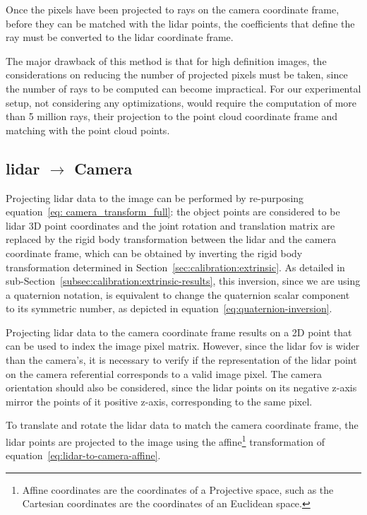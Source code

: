 Once the pixels have been projected to rays on the camera coordinate frame, before they can be matched with the \ac{lidar} points, the coefficients that define the ray must be converted to the \ac{lidar} coordinate frame.

The major drawback of this method is that for high definition images, the considerations on reducing the number of projected pixels must be taken, since the number of rays to be computed can become impractical. For our experimental setup, not considering any optimizations, would require the computation of more than 5 million rays, their projection to the point cloud coordinate frame and matching with the point cloud points.


\subsection{\ac{lidar} $\rightarrow$ Camera}
\label{subsec:sensor-fusion-lidar-to-camera}
Projecting \ac{lidar} data to the image can be performed by re-purposing equation~\eqref{eq: camera_transform_full}: the object points are considered to be \ac{lidar} 3D point coordinates and the joint rotation and translation matrix are replaced by the rigid body transformation between the \ac{lidar} and the camera coordinate frame, which can be obtained by inverting the rigid body transformation determined in Section~\ref{sec:calibration:extrinsic}. As detailed in sub-Section~\ref{subsec:calibration:extrinsic-results}, this inversion, since we are using a quaternion notation, is equivalent to change the quaternion scalar component to its symmetric number, as depicted in equation~\eqref{eq:quaternion-inversion}.

Projecting \ac{lidar} data to the camera coordinate frame results on a 2D point that can be used to index the image pixel matrix. However, since the \ac{lidar} \ac{fov} is wider than the camera's, it is necessary to verify if the representation of the \ac{lidar} point on the camera referential corresponds to a valid image pixel. The camera orientation should also be considered, since the \ac{lidar} points on its negative z-axis mirror the points of it positive z-axis, corresponding to the same pixel.

To translate and rotate the \ac{lidar} data to match the camera coordinate frame, the \ac{lidar} points are projected to the image using the affine\footnote{Affine coordinates are the coordinates of a Projective space, such as the Cartesian coordinates are the coordinates of an Euclidean space.} transformation of equation~\ref{eq:lidar-to-camera-affine}. 

